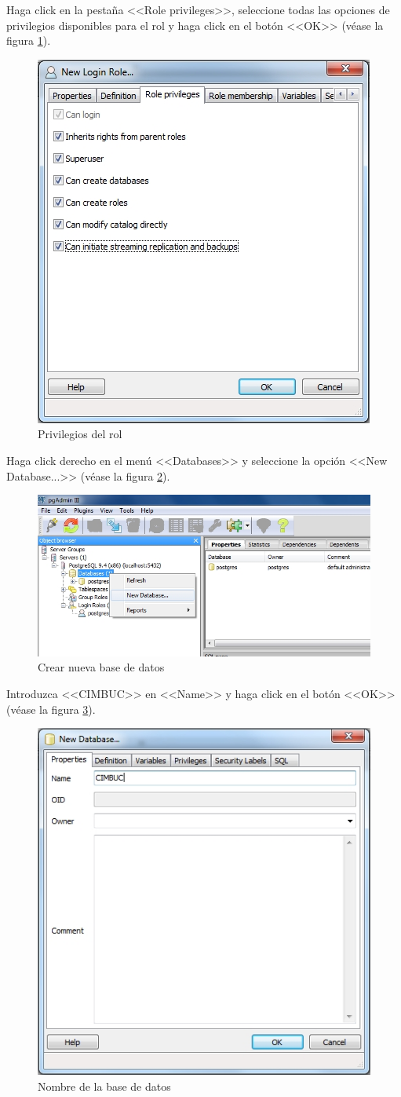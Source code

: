 \vfill
Haga click en la pesta\~{n}a <<Role privileges>>, seleccione todas las opciones de privilegios disponibles para el rol y haga click en el bot\'{o}n <<OK>> (v\'{e}ase la figura \ref{fig:pgadmin-rol-privilegios}).
\vfill
\begin{figure}[H]
  \centering
  \includegraphics[width=.45\linewidth]{./img/pgadmin-rol-privilegios.jpg}
\caption[]{Privilegios del rol\label{fig:pgadmin-rol-privilegios}}
\end{figure}
\vfill
\newpage

Haga click derecho en el men\'{u} <<Databases>> y seleccione la opci\'{o}n <<New Database...>> (v\'{e}ase la figura \ref{fig:pgadmin-bd}).
\vfill
\begin{figure}[H]
  \centering
  \includegraphics[width=1\linewidth]{./img/pgadmin-bd.jpg}
\caption[]{Crear nueva base de datos\label{fig:pgadmin-bd}}
\end{figure}
\vfill
Introduzca <<CIMBUC>> en <<Name>> y haga click en el bot\'{o}n <<OK>> (v\'{e}ase la figura \ref{fig:pgadmin-bd-nombre}).
\vfill
\begin{figure}[H]
  \centering
  \includegraphics[width=.5\linewidth]{./img/pgadmin-bd-nombre.jpg}
\caption[]{Nombre de la base de datos\label{fig:pgadmin-bd-nombre}}
\end{figure}
\vfill
\newpage

